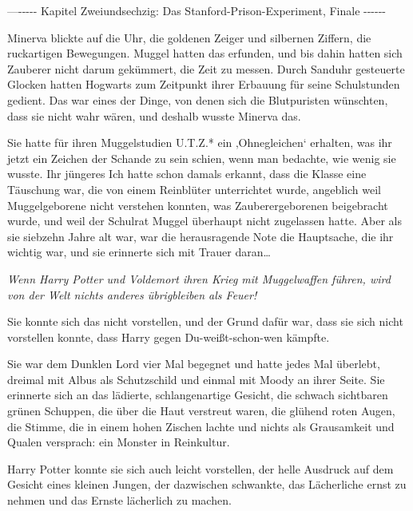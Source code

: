 

\hypertarget{das-stanford-prison-experiment-finale}{%

—\/-\/-\/-\/-\/- Kapitel Zweiundsechzig: Das Stanford-Prison-Experiment, Finale -\/-\/-\/-\/-\/-

Minerva blickte auf die Uhr, die goldenen Zeiger und silbernen Ziffern, die ruckartigen Bewegungen. Muggel hatten das erfunden, und bis dahin hatten sich Zauberer nicht darum gekümmert, die Zeit zu messen. Durch Sanduhr gesteuerte Glocken hatten Hogwarts zum Zeitpunkt ihrer Erbauung für seine Schulstunden gedient. Das war eines der Dinge, von denen sich die Blutpuristen wünschten, dass sie nicht wahr wären, und deshalb wusste Minerva das.

Sie hatte für ihren Muggelstudien U.T.Z.* ein ‚Ohnegleichen` erhalten, was ihr jetzt ein Zeichen der Schande zu sein schien, wenn man bedachte, wie wenig sie wusste. Ihr jüngeres Ich hatte schon damals erkannt, dass die Klasse eine Täuschung war, die von einem Reinblüter unterrichtet wurde, angeblich weil Muggelgeborene nicht verstehen konnten, was Zauberergeborenen beigebracht wurde, und weil der Schulrat Muggel überhaupt nicht zugelassen hatte. Aber als sie siebzehn Jahre alt war, war die herausragende Note die Hauptsache, die ihr wichtig war, und sie erinnerte sich mit Trauer daran…

\emph{Wenn Harry Potter und Voldemort ihren Krieg mit Muggelwaffen führen, wird von der Welt nichts anderes übrigbleiben als Feuer!}

Sie konnte sich das nicht vorstellen, und der Grund dafür war, dass sie sich nicht vorstellen konnte, dass Harry gegen Du-weißt-schon-wen kämpfte.

Sie war dem Dunklen Lord vier Mal begegnet und hatte jedes Mal überlebt, dreimal mit Albus als Schutzschild und einmal mit Moody an ihrer Seite. Sie erinnerte sich an das lädierte, schlangenartige Gesicht, die schwach sichtbaren grünen Schuppen, die über die Haut verstreut waren, die glühend roten Augen, die Stimme, die in einem hohen Zischen lachte und nichts als Grausamkeit und Qualen versprach: ein Monster in Reinkultur.

Harry Potter konnte sie sich auch leicht vorstellen, der helle Ausdruck auf dem Gesicht eines kleinen Jungen, der dazwischen schwankte, das Lächerliche ernst zu nehmen und das Ernste lächerlich zu machen.

}

